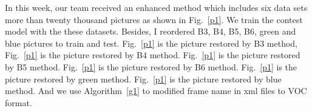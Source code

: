 \documentclass[a4paper]{article}
\begin{document}
In this week, our team received an enhanced method which includes six data sets more than twenty thousand pictures as shown in Fig.~\ref{p1}. We train the contest model with the these datasets. Besides, I reordered B3, B4, B5, B6, green and blue pictures to train and test. Fig.~\ref{p1} is the picture restored by B3 method, Fig.~\ref{p1} is the picture restored by B4 method. Fig.~\ref{p1} is the picture restored by B5 method. Fig.~\ref{p1} is the picture restored by B6 method. Fig.~\ref{p1} is the picture restored by green method. Fig.~\ref{p1} is the picture restored by blue method. And we use Algorithm~\ref{g1} to modified frame name in xml files to VOC format.
\begin{figure}
	\centering 
\end{figure}
\end{document}
